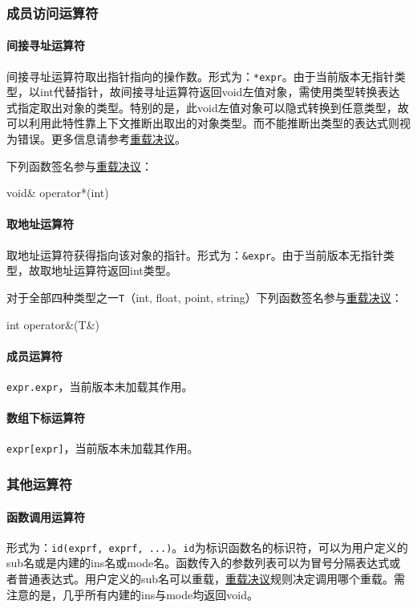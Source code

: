 \documentclass{article}
\begin{document}
\subsubsection{成员访问运算符}
\label{chengyuan}

\paragraph{间接寻址运算符} 间接寻址运算符取出指针指向的操作数。形式为：\verb|*expr|。由于当前版本无指针类型，以int代替指针，故间接寻址运算符返回void左值对象，需使用类型转换表达式指定取出对象的类型。特别的是，此void左值对象可以隐式转换到任意类型，故可以利用此特性靠上下文推断出取出的对象类型。而不能推断出类型的表达式则视为错误。更多信息请参考\hyperref[chongzai]{重载决议}。

下列函数签名参与\hyperref[chongzai]{重载决议}：
\begin{MUAvbt}
void& operator*(int)
\end{MUAvbt}

\paragraph{取地址运算符} 取地址运算符获得指向该对象的指针。形式为：\verb|&expr|。由于当前版本无指针类型，故取地址运算符返回int类型。

对于全部四种类型之一\verb|T|（int, float, point, string）下列函数签名参与\hyperref[chongzai]{重载决议}：
\begin{MUAvbt}
int operator&(T&)
\end{MUAvbt}

\paragraph{成员运算符} \verb|expr.expr|，当前版本未加载其作用。

\paragraph{数组下标运算符} \verb|expr[expr]|，当前版本未加载其作用。

\subsubsection{其他运算符}
\label{qita}

\paragraph{函数调用运算符} 形式为：\verb|id(exprf, exprf, ...)|。\verb|id|为标识函数名的标识符，可以为用户定义的sub名或是内建的ins名或mode名。函数传入的参数列表可以为冒号分隔表达式或者普通表达式。用户定义的sub名可以重载，\hyperref[chongzai]{重载决议}规则决定调用哪个重载。需注意的是，几乎所有内建的ins与mode均返回void。
\end{document}
